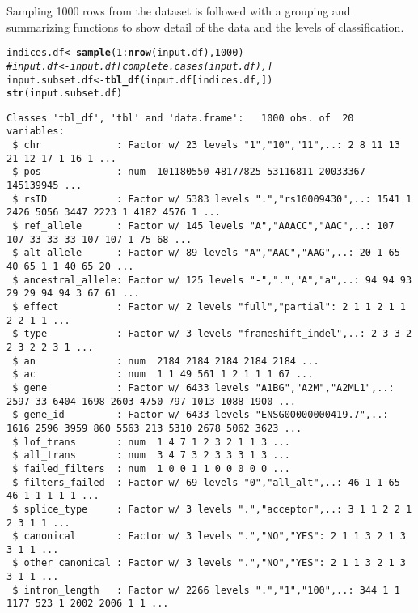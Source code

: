 \documentclass[9pt,english]{extarticle}\usepackage[]{graphicx}\usepackage[]{color}
\makeatletter
\newcommand{\hlnum}[1]{\textcolor[rgb]{0.686,0.059,0.569}{#1}}%
\newcommand{\hlcom}[1]{\textcolor[rgb]{0.678,0.584,0.686}{\textit{#1}}}%
\newcommand{\hlopt}[1]{\textcolor[rgb]{0,0,0}{#1}}%
\newcommand{\hlstd}[1]{\textcolor[rgb]{0.345,0.345,0.345}{#1}}%
\newcommand{\hlkwb}[1]{\textcolor[rgb]{0.69,0.353,0.396}{#1}}%
\newcommand{\hlkwd}[1]{\textcolor[rgb]{0.737,0.353,0.396}{\textbf{#1}}}%
\newenvironment{kframe}{%
 \def\at@end@of@kframe{}%
 \ifinner\ifhmode%
  \def\at@end@of@kframe{\end{minipage}}%
  \begin{minipage}{\columnwidth}%
 \fi\fi%
 \def\FrameCommand##1{\hskip\@totalleftmargin \hskip-\fboxsep
 \colorbox{shadecolor}{##1}\hskip-\fboxsep
     \hskip-\linewidth \hskip-\@totalleftmargin \hskip\columnwidth}%
 \MakeFramed {\advance\hsize-\width
   \@totalleftmargin\z@ \linewidth\hsize
   \@setminipage}}%
 {\par\unskip\endMakeFramed%
 \at@end@of@kframe}
\newenvironment{knitrout}{}{} %
\makeatother
\begin{document}
\begin{linenumbers}
Sampling 1000 rows from the dataset is followed with a grouping and summarizing functions to show detail of the data and the levels of classification.
\begin{knitrout}
\color{fgcolor}\begin{kframe}
\begin{alltt}
\hlstd{indices.df} \hlkwb{<-} \hlkwd{sample}\hlstd{(}\hlnum{1}\hlopt{:}\hlkwd{nrow}\hlstd{(input.df),}\hlnum{1000}\hlstd{)}
\hlcom{#input.df <- input.df[complete.cases(input.df), ]}
\hlstd{input.subset.df} \hlkwb{<-} \hlkwd{tbl_df}\hlstd{(input.df[indices.df, ])}
\hlkwd{str}\hlstd{(input.subset.df)}
\end{alltt}
\begin{verbatim}
Classes 'tbl_df', 'tbl' and 'data.frame':	1000 obs. of  20 variables:
 $ chr             : Factor w/ 23 levels "1","10","11",..: 2 8 11 13 21 12 17 1 16 1 ...
 $ pos             : num  101180550 48177825 53116811 20033367 145139945 ...
 $ rsID            : Factor w/ 5383 levels ".","rs10009430",..: 1541 1 2426 5056 3447 2223 1 4182 4576 1 ...
 $ ref_allele      : Factor w/ 145 levels "A","AAACC","AAC",..: 107 107 33 33 33 107 107 1 75 68 ...
 $ alt_allele      : Factor w/ 89 levels "A","AAC","AAG",..: 20 1 65 40 65 1 1 40 65 20 ...
 $ ancestral_allele: Factor w/ 125 levels "-",".","A","a",..: 94 94 93 29 29 94 94 3 67 61 ...
 $ effect          : Factor w/ 2 levels "full","partial": 2 1 1 2 1 1 2 2 1 1 ...
 $ type            : Factor w/ 3 levels "frameshift_indel",..: 2 3 3 2 2 3 2 2 3 1 ...
 $ an              : num  2184 2184 2184 2184 2184 ...
 $ ac              : num  1 1 49 561 1 2 1 1 1 67 ...
 $ gene            : Factor w/ 6433 levels "A1BG","A2M","A2ML1",..: 2597 33 6404 1698 2603 4750 797 1013 1088 1900 ...
 $ gene_id         : Factor w/ 6433 levels "ENSG00000000419.7",..: 1616 2596 3959 860 5563 213 5310 2678 5062 3623 ...
 $ lof_trans       : num  1 4 7 1 2 3 2 1 1 3 ...
 $ all_trans       : num  3 4 7 3 2 3 3 3 1 3 ...
 $ failed_filters  : num  1 0 0 1 1 0 0 0 0 0 ...
 $ filters_failed  : Factor w/ 69 levels "0","all_alt",..: 46 1 1 65 46 1 1 1 1 1 ...
 $ splice_type     : Factor w/ 3 levels ".","acceptor",..: 3 1 1 2 2 1 2 3 1 1 ...
 $ canonical       : Factor w/ 3 levels ".","NO","YES": 2 1 1 3 2 1 3 3 1 1 ...
 $ other_canonical : Factor w/ 3 levels ".","NO","YES": 2 1 1 3 2 1 3 3 1 1 ...
 $ intron_length   : Factor w/ 2266 levels ".","1","100",..: 344 1 1 1177 523 1 2002 2006 1 1 ...
\end{verbatim}
\begin{alltt}

\end{alltt}
\end{kframe}
\end{knitrout}
\end{linenumbers}
\end{document}
